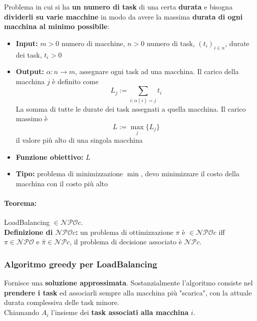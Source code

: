 Problema in cui si ha \textbf{un numero di task} di una certa \textbf{durata} e bisogna \textbf{dividerli su varie macchine} in modo da avere la massima \textbf{durata di ogni macchina al minimo possibile}:
\begin{itemize}
	\item \textbf{Input:} $m > 0$ numero di macchine, $n>0$ numero di task, $(t_i)_{i \in n}$, durate dei task, $t_i > 0$
	
	\item \textbf{Output:} $\alpha: n \rightarrow m$, assegnare ogni task ad una macchina. Il carico della macchina $j$ è definito come 
	$$ L_j := \sum_{i: \alpha (i) = j} t_i$$
	La somma di tutte le durate dei task assegnati a quella macchina. Il carico massimo è
	$$ L := \max_j \{L_j\}$$ 
	il valore più alto di una singola macchina
	
	\item \textbf{Funzione obiettivo:} $L$
	
	\item \textbf{Tipo:} problema di minimizzazione $\min$, devo minimizzare il costo della macchina con il costo più alto
\end{itemize}

\paragraph{Teorema:} LoadBalancing $\in \mathcal{NPO}c$.\\

\textbf{Definizione di $\mathcal{NPO}c$:} un problema di ottimizzazione $\pi$ è $\in \mathcal{NPO}c$ iff $\pi \in \mathcal{NPO}$ e $\hat{\pi} \in \mathcal{NP}c$, il problema di decisione associato è $\mathcal{NP}c$.\\

\newpage

\subsubsection{Algoritmo greedy per LoadBalancing}

Fornisce una \textbf{soluzione approssimata}. Sostanzialmente l'algoritmo consiste nel \textbf{prendere i task} ed associarli sempre alla macchina più "scarica", con la attuale durata complessiva delle task minore.\\

Chiamando $A_i$ l'insieme dei \textbf{task associati alla macchina} $i$.\\

